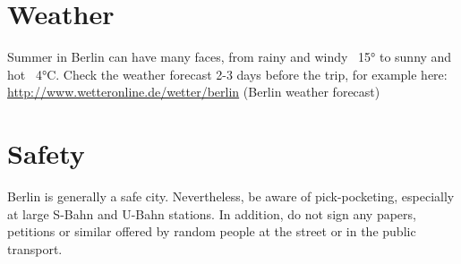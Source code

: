 \section{Weather}

Summer in Berlin can have many faces, from rainy and windy ~15° to sunny and hot ~4°C. Check the weather forecast 2-3 days before the trip, for example here: \url{http://www.wetteronline.de/wetter/berlin} (Berlin weather forecast)

\section{Safety}

Berlin is generally a safe city. Nevertheless, be aware of pick-pocketing, especially at large S-Bahn and U-Bahn stations. In addition, do not sign any papers, petitions or similar offered by random people at the street or in the public transport.
